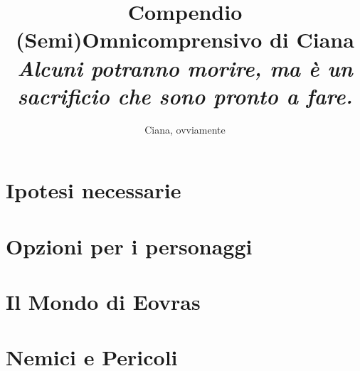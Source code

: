 \documentclass[letterpaper,twocolumn,openany,nodeprecatedcode]{dndbook}
\title{Compendio (Semi)Omnicomprensivo di Ciana\\
    \large {\textit{Alcuni potranno morire, ma è un sacrificio che sono pronto a fare.}}
    }
\author{Ciana, ovviamente}
\date{}
\begin{document}
\frontmatter

\maketitle

\tableofcontents

\mainmatter%

\part{Ipotesi necessarie}





\part{Opzioni per i personaggi}



































\part{Il Mondo di Eovras}







\part{Nemici e Pericoli}
\end{document}
